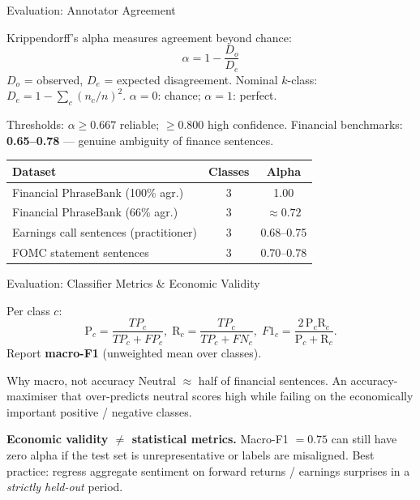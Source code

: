 \documentclass[9pt,t]{beamer}
\begin{document}
\begin{frame}{Evaluation: Annotator Agreement}
\begin{underhood}
Krippendorff's alpha measures agreement beyond chance:
\[
\alpha = 1-\frac{D_o}{D_e}
\]
$D_o$ = observed, $D_e$ = expected disagreement. Nominal $k$-class:
$D_e = 1-\sum_c (n_c/n)^2$. \quad $\alpha=0$: chance; $\alpha=1$: perfect.
\end{underhood}

\medskip
Thresholds: $\alpha\geq 0.667$ reliable; $\geq 0.800$ high confidence.
Financial benchmarks: \textbf{0.65--0.78} --- genuine ambiguity of finance sentences.

\medskip
\small
\begin{tabular}{lcc}
\toprule
Dataset & Classes & Alpha \\
\midrule
Financial PhraseBank (100\% agr.)   & 3 & 1.00 \\
Financial PhraseBank (66\% agr.)    & 3 & $\approx 0.72$ \\
Earnings call sentences (practitioner) & 3 & 0.68--0.75 \\
FOMC statement sentences            & 3 & 0.70--0.78 \\
\bottomrule
\end{tabular}
\end{frame}

\begin{frame}{Evaluation: Classifier Metrics \& Economic Validity}
\begin{underhood}
Per class $c$:
\[
\text{P}_c=\frac{TP_c}{TP_c+FP_c},\;
\text{R}_c=\frac{TP_c}{TP_c+FN_c},\;
F1_c=\frac{2\,\text{P}_c\text{R}_c}{\text{P}_c+\text{R}_c}.
\]
Report \textbf{macro-F1} (unweighted mean over classes).
\end{underhood}

\medskip
\begin{alertblock}{Why macro, not accuracy}
Neutral $\approx$ half of financial sentences. An accuracy-maximiser that
over-predicts neutral scores high while failing on the economically important
positive / negative classes.
\end{alertblock}

\medskip
\textbf{Economic validity $\neq$ statistical metrics.} Macro-F1 $=0.75$ can still
have zero alpha if the test set is unrepresentative or labels are misaligned.
Best practice: regress aggregate sentiment on forward returns / earnings surprises
in a \emph{strictly held-out} period.
\end{frame}
\end{document}
